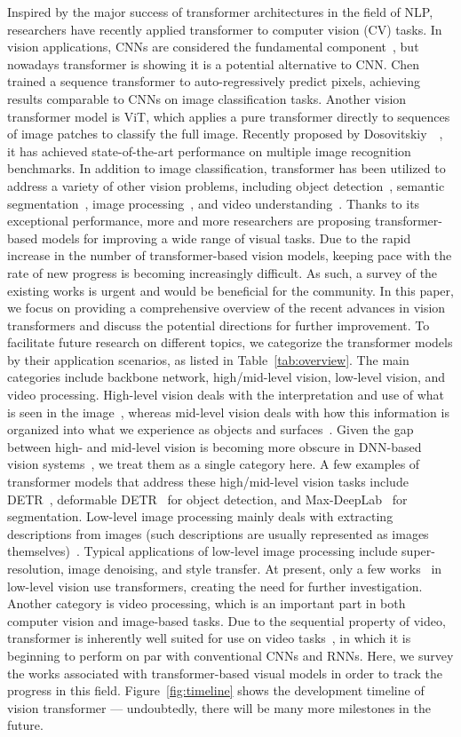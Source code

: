 Inspired by the major success of transformer architectures in the field of NLP, researchers have recently applied transformer to computer vision (CV) tasks. In vision applications, CNNs are considered the fundamental component~, but nowadays transformer is showing it is a potential alternative to CNN. Chen~\etal~ trained a sequence transformer to auto-regressively predict pixels, achieving results comparable to CNNs on image classification tasks. Another vision transformer model is ViT, which applies a pure transformer directly to sequences of image patches to classify the full image. Recently proposed by Dosovitskiy~\etal~, it has achieved state-of-the-art performance on multiple image recognition benchmarks. In addition to image classification, transformer has been utilized to address a variety of other vision problems, including object detection~, semantic segmentation~, image processing~, and video understanding~. Thanks to its exceptional performance, more and more researchers are proposing transformer-based models for improving a wide range of visual tasks.
Due to the rapid increase in the number of transformer-based vision models, keeping pace with the rate of new progress is becoming increasingly difficult. As such, a survey of the existing works is urgent and would be beneficial for the community. In this paper, we focus on providing a comprehensive overview of the recent advances in vision transformers and discuss the potential directions for further improvement. To facilitate future research on different topics, we categorize the transformer models by their application scenarios, as listed in Table~\ref{tab:overview}. The main categories include backbone network, high/mid-level vision, low-level vision, and video processing. High-level vision deals with the interpretation and use of what is seen in the image~, whereas mid-level vision deals with how this information is organized into what we experience as objects and surfaces~. Given the gap between high- and mid-level vision is becoming more obscure in DNN-based vision systems~, we treat them as a single category here. A few examples of transformer models that address these high/mid-level vision tasks include DETR~, deformable DETR~ for object detection, and Max-DeepLab~ for segmentation. Low-level image processing mainly deals with extracting descriptions from images (such descriptions are usually represented as images themselves)~. Typical applications of low-level image processing include super-resolution, image denoising, and style transfer. At present, only a few works~ in low-level vision use transformers, creating the need for further investigation. Another category is video processing, which is an important part in both computer vision and image-based tasks. Due to the sequential property of video, transformer is inherently well suited for use on video tasks~, in which it is beginning to perform on par with conventional CNNs and RNNs. Here, we survey the works associated with transformer-based visual models in order to track the progress in this field. Figure~\ref{fig:timeline} shows the development timeline of vision transformer — undoubtedly, there will be many more milestones in the future.

